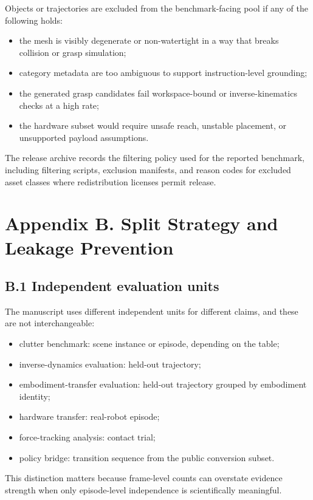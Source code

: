 \documentclass[11pt]{article}
\begin{document}
Objects or trajectories are excluded from the benchmark-facing pool if any of the following holds:

\begin{itemize}[leftmargin=1.5em]
\item the mesh is visibly degenerate or non-watertight in a way that breaks collision or grasp simulation;
\item category metadata are too ambiguous to support instruction-level grounding;
\item the generated grasp candidates fail workspace-bound or inverse-kinematics checks at a high rate;
\item the hardware subset would require unsafe reach, unstable placement, or unsupported payload assumptions.
\end{itemize}

The release archive records the filtering policy used for the reported benchmark, including filtering scripts, exclusion manifests, and reason codes for excluded asset classes where redistribution licenses permit release.

\section{Appendix B. Split Strategy and Leakage Prevention}

\subsection{B.1 Independent evaluation units}

The manuscript uses different independent units for different claims, and these are not interchangeable:

\begin{itemize}[leftmargin=1.5em]
\item clutter benchmark: scene instance or episode, depending on the table;
\item inverse-dynamics evaluation: held-out trajectory;
\item embodiment-transfer evaluation: held-out trajectory grouped by embodiment identity;
\item hardware transfer: real-robot episode;
\item force-tracking analysis: contact trial;
\item policy bridge: transition sequence from the public conversion subset.
\end{itemize}

This distinction matters because frame-level counts can overstate evidence strength when only episode-level independence is scientifically meaningful.
\end{document}
